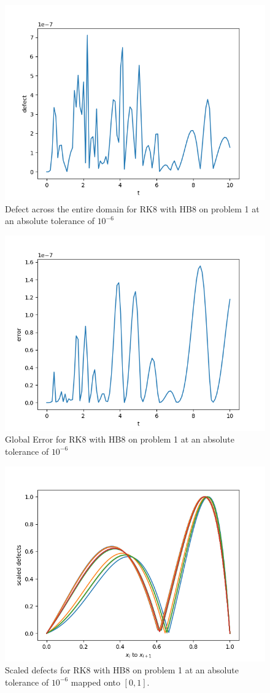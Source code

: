 \begin{figure}[H]
\centering
\includegraphics[width=0.7\linewidth]{./figures/rk8_with_hb8_p1_global_defect}
\caption{Defect across the entire domain for RK8 with HB8 on problem 1 at an absolute tolerance of $10^{-6}$}
\label{fig:rk8_with_hb8_p1_global_defect}
\end{figure}

\begin{figure}[H]
\centering
\includegraphics[width=0.7\linewidth]{./figures/rk8_with_hb8_p1_global_error}
\caption{Global Error for RK8 with HB8 on problem 1 at an absolute tolerance of $10^{-6}$}
\label{fig:rk8_with_hb8_p1_global_error}
\end{figure}

\begin{figure}[H]
\centering
\includegraphics[width=0.7\linewidth]{./figures/rk8_with_hb8_p1_scaled_defects}
\caption{Scaled defects for RK8 with HB8 on problem 1 at an absolute tolerance of $10^{-6}$  mapped onto $[0, 1]$.}
\label{fig:rk8_with_hb8_p1_scaled_defects}
\end{figure}

